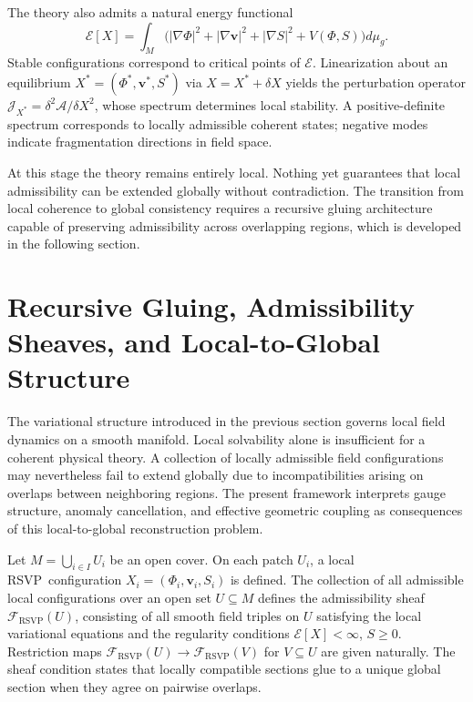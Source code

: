\documentclass[12pt,a4paper]{article}
\newcommand{\RSVP}{\textrm{RSVP}}
\newcommand{\Sheaf}{\mathcal{F}}
\begin{document}
The theory also admits a natural energy functional
\[
\mathcal{E}[X]
= \int_M\!\bigl(|\nabla\Phi|^2+|\nabla\mathbf{v}|^2+|\nabla S|^2+V(\Phi,S)\bigr)d\mu_g.
\]
Stable configurations correspond to critical points of $\mathcal{E}$.
Linearization about an equilibrium $X^\ast=(\Phi^\ast,\mathbf{v}^\ast,S^\ast)$
via $X=X^\ast+\delta X$ yields the perturbation operator
$\mathcal{J}_{X^\ast}=\delta^2\mathcal{A}/\delta X^2$, whose spectrum
determines local stability. A positive-definite spectrum corresponds to locally
admissible coherent states; negative modes indicate fragmentation directions in
field space.

At this stage the theory remains entirely local. Nothing yet guarantees that
local admissibility can be extended globally without contradiction. The
transition from local coherence to global consistency requires a recursive
gluing architecture capable of preserving admissibility across overlapping
regions, which is developed in the following section.

\section{Recursive Gluing, Admissibility Sheaves, and Local-to-Global Structure}

The variational structure introduced in the previous section governs local field
dynamics on a smooth manifold. Local solvability alone is insufficient for a
coherent physical theory. A collection of locally admissible field configurations
may nevertheless fail to extend globally due to incompatibilities arising on
overlaps between neighboring regions. The present framework interprets gauge
structure, anomaly cancellation, and effective geometric coupling as consequences
of this local-to-global reconstruction problem.

Let $M=\bigcup_{i\in I} U_i$ be an open cover. On each patch $U_i$, a local
\RSVP\ configuration $X_i=(\Phi_i,\mathbf{v}_i,S_i)$ is defined. The
collection of all admissible local configurations over an open set $U\subseteq M$
defines the admissibility sheaf $\Sheaf_\RSVP(U)$, consisting of all smooth
field triples on $U$ satisfying the local variational equations and the
regularity conditions $\mathcal{E}[X]<\infty$, $S\geq 0$. Restriction maps
$\Sheaf_\RSVP(U)\to\Sheaf_\RSVP(V)$ for $V\subseteq U$ are given naturally. The
sheaf condition states that locally compatible sections glue to a unique global
section when they agree on pairwise overlaps.
\end{document}
